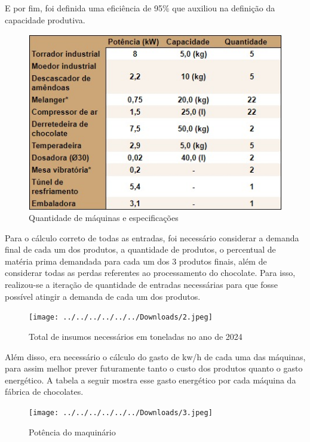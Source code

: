 \documentclass[
	12pt,				%
	openright,			%
	oneside,			%
	a4paper,			%
	english,			%
	french,				%
	spanish,			%
	brazil				%
	]{abntex2}
\begin{document}
E por fim, foi definida uma eficiência de 95$\%$ que auxiliou na definição da capacidade produtiva.

\begin{figure}[H]
\begin{center}
\caption{Quantidade de máquinas e especificações}
\includegraphics[scale=0.8]{../../Pictures/WhatsApp Image 2022-09-22 at 20.50.16.jpeg} 
\end{center}
\end{figure}

Para o cálculo correto de todas as entradas, foi necessário considerar a demanda final de cada um dos produtos, a quantidade de produtos, o percentual de matéria prima demandada para cada um dos 3 produtos finais, além de considerar todas as perdas referentes ao processamento do chocolate. Para isso, realizou-se a iteração de quantidade de entradas necessárias para que fosse possível atingir a demanda de cada um dos produtos.

\begin{figure}[H]
\begin{center}
\caption{Total de insumos necessários em toneladas no ano de 2024}
\texttt{[image: ../../../../../../Downloads/2.jpeg]} 
\end{center}
\end{figure}

Além disso, era necessário o cálculo do gasto de kw/h de cada uma das máquinas, para assim melhor prever futuramente tanto o custo dos produtos quanto o gasto energético. A tabela a seguir mostra esse gasto energético por cada máquina da fábrica de chocolates.

\begin{figure}[H]
\begin{center}
\caption{Potência do maquinário}
\texttt{[image: ../../../../../../Downloads/3.jpeg]} 
\end{center}
\end{figure}
\end{document}
